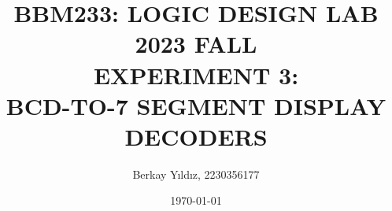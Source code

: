 \title{BBM233: LOGIC DESIGN LAB \\ 2023 FALL \\ EXPERIMENT 3: \\ BCD-TO-7 SEGMENT DISPLAY DECODERS}
\date{\today}
\author{Berkay Yıldız, 2230356177}

\maketitle
